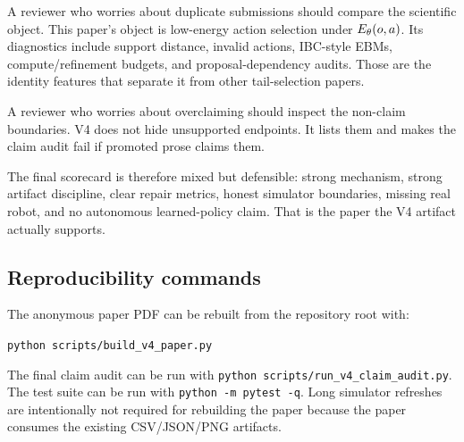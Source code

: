 A reviewer who worries about duplicate submissions should compare the
scientific object. This paper's object is low-energy action selection under
\(E_\theta(o,a)\). Its diagnostics include support distance, invalid actions,
IBC-style EBMs, compute/refinement budgets, and proposal-dependency audits.
Those are the identity features that separate it from other tail-selection
papers.

A reviewer who worries about overclaiming should inspect the non-claim
boundaries. V4 does not hide unsupported endpoints. It lists them and makes
the claim audit fail if promoted prose claims them.

The final scorecard is therefore mixed but defensible: strong mechanism,
strong artifact discipline, clear repair metrics, honest simulator boundaries,
missing real robot, and no autonomous learned-policy claim. That is the paper
the V4 artifact actually supports.

\subsection{Reproducibility commands}

The anonymous paper PDF can be rebuilt from the repository root with:
\begin{center}
\small
\texttt{python scripts/build\_v4\_paper.py}
\end{center}
The final claim audit can be run with \texttt{python scripts/run\_v4\_claim\_audit.py}. The test suite can be run with \texttt{python -m pytest -q}. Long simulator refreshes are intentionally not required for rebuilding the paper because the paper consumes the existing CSV/JSON/PNG artifacts.
